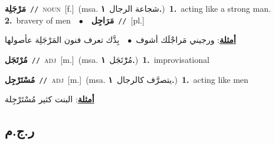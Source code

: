 \documentclass[10pt,a4paper,twoside]{article} %
\begin{document}
\begin{multicols}{2}
{\setlength\topsep{0pt}\textbf{\foreignlanguage{arabic}{مَرْجَلِة}}\ {\color{gray}\texttt{//}\color{black}}\ \textsc{noun}\ [f.]\ \color{gray}(msa. \foreignlanguage{arabic}{شجاعة الرجال}~\foreignlanguage{arabic}{\textbf{١.}})\color{black}\ \textbf{1.}~acting like a strong man.  \textbf{2.}~bravery of men\ \ $\bullet$\ \ \setlength\topsep{0pt}\textbf{\foreignlanguage{arabic}{مَرَاجِل}}\ {\color{gray}\texttt{//}\color{black}}\ [pl.]\  \begin{flushright}\color{gray}\foreignlanguage{arabic}{\textbf{\underline{\foreignlanguage{arabic}{أمثلة}}}: ورجيني مَراجْلَك أشوف\ $\bullet$\ \  بِدَّك تعرف فنون المَرْجَلِة عأصولها}\end{flushright}\color{black}} \vspace{2mm}

{\setlength\topsep{0pt}\textbf{\foreignlanguage{arabic}{مُرْتَجَل}}\ {\color{gray}\texttt{//}\color{black}}\ \textsc{adj}\ [m.]\ \color{gray}(msa. \foreignlanguage{arabic}{مُرْْتَجَل}~\foreignlanguage{arabic}{\textbf{١.}})\color{black}\ \textbf{1.}~improvisational\ } \vspace{2mm}

{\setlength\topsep{0pt}\textbf{\foreignlanguage{arabic}{مُسْتَرْجِل}}\ {\color{gray}\texttt{//}\color{black}}\ \textsc{adj}\ [m.]\ \color{gray}(msa. \foreignlanguage{arabic}{يتصرَّف كالرجال}~\foreignlanguage{arabic}{\textbf{١.}})\color{black}\ \textbf{1.}~acting like men\  \begin{flushright}\color{gray}\foreignlanguage{arabic}{\textbf{\underline{\foreignlanguage{arabic}{أمثلة}}}: البنت كثير مُسْتَرْجِلة}\end{flushright}\color{black}} \vspace{2mm}

\vspace{-3mm}
\subsection*{\color{blue}\foreignlanguage{arabic}{ر.ج.م}\color{blue}{}} 


\end{multicols}
\end{document}
